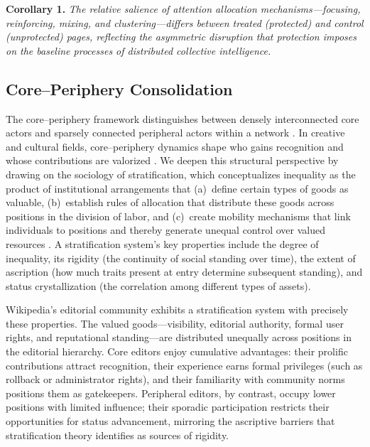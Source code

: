 \documentclass[11pt]{article}
\begin{document}
\smallskip
\noindent\textbf{Corollary 1.} \emph{The relative salience of attention allocation mechanisms---focusing, reinforcing, mixing, and clustering---differs between treated (protected) and control (unprotected) pages, reflecting the asymmetric disruption that protection imposes on the baseline processes of distributed collective intelligence.}

\subsection{Core--Periphery Consolidation}

The core--periphery framework distinguishes between densely interconnected core actors and sparsely connected peripheral actors within a network \citep{Borgatti2000}. In creative and cultural fields, core--periphery dynamics shape who gains recognition and whose contributions are valorized \citep{Cattani2014, Cattani2017}. We deepen this structural perspective by drawing on the sociology of stratification, which conceptualizes inequality as the product of institutional arrangements that (a)~define certain types of goods as valuable, (b)~establish rules of allocation that distribute these goods across positions in the division of labor, and (c)~create mobility mechanisms that link individuals to positions and thereby generate unequal control over valued resources \citep{Grusky2001}. A stratification system's key properties include the degree of inequality, its rigidity (the continuity of social standing over time), the extent of ascription (how much traits present at entry determine subsequent standing), and status crystallization (the correlation among different types of assets).

Wikipedia's editorial community exhibits a stratification system with precisely these properties. The valued goods---visibility, editorial authority, formal user rights, and reputational standing---are distributed unequally across positions in the editorial hierarchy. Core editors enjoy cumulative advantages: their prolific contributions attract recognition, their experience earns formal privileges (such as rollback or administrator rights), and their familiarity with community norms positions them as gatekeepers. Peripheral editors, by contrast, occupy lower positions with limited influence; their sporadic participation restricts their opportunities for status advancement, mirroring the ascriptive barriers that stratification theory identifies as sources of rigidity.
\end{document}
